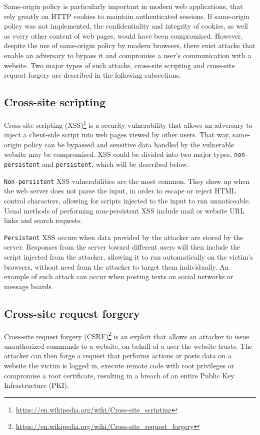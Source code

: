 Same-origin policy is particularly important in modern web applications, that
rely greatly on HTTP cookies to maintain authenticated sessions. If same-origin
policy was not implemented, the confidentiality and integrity of cookies, as
well as every other content of web pages, would have been compromised. However,
despite the use of same-origin policy by modern browsers, there exist attacks
that enable an adversary to bypass it and compromise a user's communication with
a website. Two major types of such attacks, cross-site scripting and cross-site
request forgery are described in the following subsections.

\subsection{Cross-site scripting}

Cross-site scripting
(XSS)\footnote{\url{https://en.wikipedia.org/wiki/Cross-site_scripting}} is a
security vulnerability that allows an adversary to inject a client-side script
into web pages viewed by other users. That way, same-origin policy can be
bypassed and sensitive data handled by the vulnerable website may be
compromised. XSS could be divided into two major types, \texttt{non-persistent}
and \texttt{persistent}, which will be described below.

\texttt{Non-persistent} XSS vulnerabilities are the most common. They show up
when the web server does not parse the input, in order to escape or reject HTML
control characters, allowing for scripts injected to the input to run
unnoticeable.  Usual methods of performing non-persistent XSS include mail or
website URL links and search requests.

\texttt{Persistent} XSS occurs when data provided by the attacker are stored by
the server. Responses from the server toward different users will then include
the script injected from the attacker, allowing it to run automatically on the
victim's browsers, without need from the attacker to target them individually.
An example of such attack can occur when posting texts on social networks or
message boards.

\subsection{Cross-site request forgery}

Cross-site request forgery
(CSRF)\footnote{\url{https://en.wikipedia.org/wiki/Cross-site_request_forgery}}
is an exploit that allows an attacker to issue unauthorized commands to a
website, on behalf of a user the website trusts.  The attacker can then forge a
request that performs actions or posts data on a website the victim is logged
in, execute remote code with root privileges or compromise a root certificate,
resulting in a breach of an entire Public Key Infrastructure (PKI).

